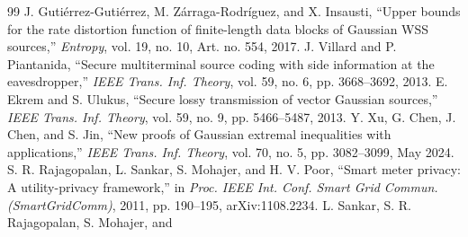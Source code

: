 \documentclass[11pt,onecolumn]{IEEEtran}
\begin{document}
\begin{thebibliography}{99}
 J. Guti\'errez-Guti\'errez,
M. Z\'arraga-Rodr\'iguez, and X. Insausti, ``Upper bounds for the rate
distortion function of finite-length data blocks of Gaussian WSS
sources,'' \emph{Entropy}, vol. 19, no. 10, Art. no. 554, 2017.
 J. Villard and P. Piantanida, ``Secure multiterminal
source coding with side information at the eavesdropper,'' \emph{IEEE
Trans. Inf. Theory}, vol. 59, no. 6, pp. 3668--3692, 2013.
 E. Ekrem and S. Ulukus, ``Secure lossy transmission of
vector Gaussian sources,'' \emph{IEEE Trans. Inf. Theory}, vol. 59, no. 9,
pp. 5466--5487, 2013.
 Y. Xu, G. Chen, J. Chen, and S. Jin, ``New proofs of
Gaussian extremal inequalities with applications,'' \emph{IEEE Trans.
Inf. Theory}, vol. 70, no. 5, pp. 3082--3099, May 2024.
 S. R. Rajagopalan, L. Sankar, S. Mohajer, and
H. V. Poor, ``Smart meter privacy: A utility-privacy framework,'' in
\emph{Proc. IEEE Int. Conf. Smart Grid Commun. (SmartGridComm)}, 2011,
pp. 190--195, arXiv:1108.2234.
 L. Sankar, S. R. Rajagopalan, S. Mohajer, and

\end{thebibliography}
\end{document}
